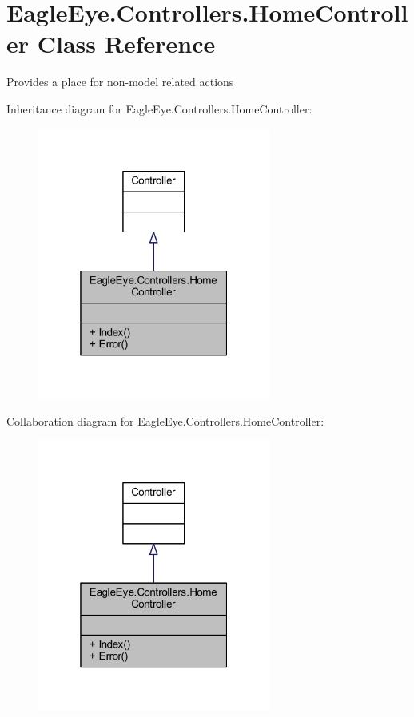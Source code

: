 \hypertarget{class_eagle_eye_1_1_controllers_1_1_home_controller}{}\section{Eagle\+Eye.\+Controllers.\+Home\+Controller Class Reference}
\label{class_eagle_eye_1_1_controllers_1_1_home_controller}


Provides a place for non-\/model related actions  




Inheritance diagram for Eagle\+Eye.\+Controllers.\+Home\+Controller\+:
\nopagebreak
\begin{figure}[H]
\begin{center}
\leavevmode
\includegraphics[width=217pt]{class_eagle_eye_1_1_controllers_1_1_home_controller__inherit__graph}
\end{center}
\end{figure}


Collaboration diagram for Eagle\+Eye.\+Controllers.\+Home\+Controller\+:
\nopagebreak
\begin{figure}[H]
\begin{center}
\leavevmode
\includegraphics[width=217pt]{class_eagle_eye_1_1_controllers_1_1_home_controller__coll__graph}
\end{center}
\end{figure}

